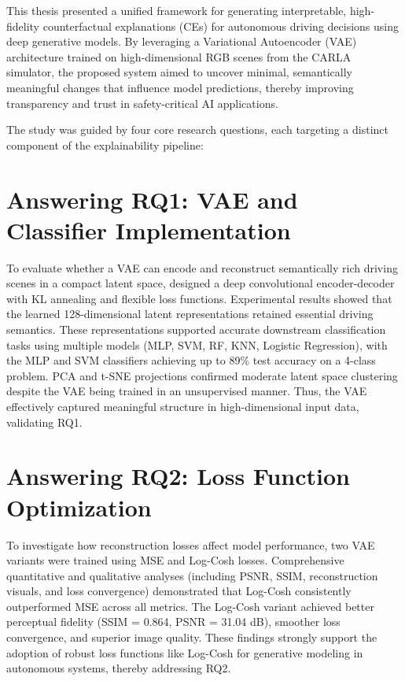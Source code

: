 This thesis presented a unified framework for generating interpretable, high-fidelity counterfactual explanations (CEs) for autonomous driving decisions using deep generative models. By leveraging a Variational Autoencoder (VAE) architecture trained on high-dimensional RGB scenes from the CARLA simulator, the proposed system aimed to uncover minimal, semantically meaningful changes that influence model predictions, thereby improving transparency and trust in safety-critical AI applications.

The study was guided by four core research questions, each targeting a distinct component of the explainability pipeline:


\section{Answering RQ1: VAE and Classifier Implementation}

To evaluate whether a VAE can encode and reconstruct semantically rich driving scenes in a compact latent space, designed a deep convolutional encoder-decoder with KL annealing and flexible loss functions. Experimental results showed that the learned 128-dimensional latent representations retained essential driving semantics. These representations supported accurate downstream classification tasks using multiple models (MLP, SVM, RF, KNN, Logistic Regression), with the MLP and SVM classifiers achieving up to 89\% test accuracy on a 4-class problem. PCA and t-SNE projections confirmed moderate latent space clustering despite the VAE being trained in an unsupervised manner. Thus, the VAE effectively captured meaningful structure in high-dimensional input data, validating RQ1.

\section{Answering RQ2: Loss Function Optimization}

To investigate how reconstruction losses affect model performance, two VAE variants were trained using MSE and Log-Cosh losses. Comprehensive quantitative and qualitative analyses (including PSNR, SSIM, reconstruction visuals, and loss convergence) demonstrated that Log-Cosh consistently outperformed MSE across all metrics. The Log-Cosh variant achieved better perceptual fidelity (SSIM = 0.864, PSNR = 31.04 dB), smoother loss convergence, and superior image quality. These findings strongly support the adoption of robust loss functions like Log-Cosh for generative modeling in autonomous systems, thereby addressing RQ2.


